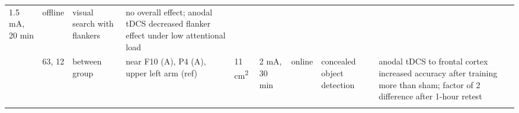 \documentclass[11pt,]{memoir}
\begin{document}
\begin{longtable}[]{@{}lllllllll@{}}
\begin{minipage}[t]{0.06\columnwidth}
1.5 mA, 20
min\strut
\end{minipage} & \begin{minipage}[t]{0.05\columnwidth}\raggedright
offline\strut
\end{minipage} & \begin{minipage}[t]{0.06\columnwidth}\raggedright
visual
search
with
flankers\strut
\end{minipage} & \begin{minipage}[t]{0.25\columnwidth}\raggedright
no overall effect; anodal tDCS decreased flanker
effect under low attentional load\strut
\end{minipage}\tabularnewline
\begin{minipage}[t]{0.08\columnwidth}\raggedright
\textcite{Clark2012}\strut
\end{minipage} & \begin{minipage}[t]{0.03\columnwidth}\raggedright
63,
12\strut
\end{minipage} & \begin{minipage}[t]{0.05\columnwidth}\raggedright
between
group\strut
\end{minipage} & \begin{minipage}[t]{0.15\columnwidth}\raggedright
near F10 (A), P4 (A), upper
left arm (ref)\strut
\end{minipage} & \begin{minipage}[t]{0.04\columnwidth}\raggedright
11
cm\textsuperscript{2}\strut
\end{minipage} & \begin{minipage}[t]{0.06\columnwidth}\raggedright
2 mA, 30
min\strut
\end{minipage} & \begin{minipage}[t]{0.05\columnwidth}\raggedright
online\strut
\end{minipage} & \begin{minipage}[t]{0.06\columnwidth}\raggedright
concealed
object
detection\strut
\end{minipage} & \begin{minipage}[t]{0.25\columnwidth}\raggedright
anodal tDCS to frontal cortex increased accuracy
after training more than sham; factor of 2
difference after 1-hour retest\strut
\end{minipage}\tabularnewline
\begin{minipage}[t]{0.08\columnwidth}\raggedright
\textcite{Coffman2012}\strut
\end{minipage} & \begin{minipage}[t]{0.03\columnwidth}\raggedright

\end{minipage}
\end{longtable}
\end{document}
